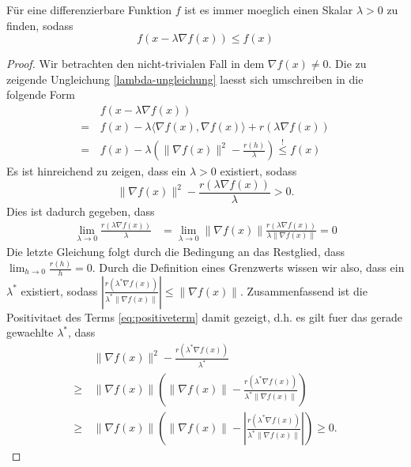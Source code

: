 \begin{Lem}
\label{lem:gradientabstieg}
F\"ur eine differenzierbare Funktion $f$ ist es immer moeglich einen Skalar $\lambda>0$ zu finden, sodass
\begin{equation}
\label{lambda-ungleichung}
f(x - \lambda \nabla f(x)) \leq f(x)
\end{equation} 
\end{Lem}


\begin{proof}
Wir betrachten den nicht-trivialen Fall in dem $\nabla f(x) \neq 0$. 
Die zu zeigende Ungleichung \eqref{lambda-ungleichung} laesst sich umschreiben in die folgende Form
\begin{align*}
&f(x - \lambda \nabla f(x))\\
 = \, &f(x) - \lambda \langle \nabla f(x), \nabla f(x)\rangle + r(\lambda \nabla f(x)) \\
= \, &f(x) - \lambda( \|\nabla f(x)\|^2 - \frac{r(h)}{\lambda}) \overset{!}{\leq} f(x)
\end{align*}
Es ist hinreichend zu zeigen, dass ein $\lambda>0$ existiert, sodass
\begin{equation}
\label{eq:positiveterm}
\|\nabla f(x)\|^2 - \frac{r(\lambda \nabla f(x))}{\lambda} >0.
\end{equation}
  Dies ist dadurch gegeben, dass 
\begin{align*}
\lim_{\lambda\to 0} \frac{r(\lambda \nabla f(x))}{\lambda} &= \lim_{\lambda \to 0}\|\nabla f(x)\| \frac{r(\lambda \nabla f(x))}{\lambda \|\nabla f(x)\|}= 0
\end{align*}
Die letzte Gleichung folgt durch die Bedingung an das Restglied, dass $\lim_{h\to 0}\frac{r(h)}{h} = 0$. Durch die Definition eines Grenzwerts wissen wir also, dass ein $\lambda^*$ existiert, sodass $\left| \frac{r(\lambda^* \nabla f(x))}{\lambda^* \|\nabla f(x)\|} \right| \leq \|\nabla f(x)\|$. Zusammenfassend ist die Positivitaet des Terms \eqref{eq:positiveterm} damit gezeigt, d.h. es gilt fuer das gerade gewaehlte $\lambda^*$, dass
\begin{align*}
&\|\nabla f(x)\|^2 - \frac{r(\lambda^* \nabla f(x))}{\lambda^*} \\
\geq \, &\|\nabla f(x)\| \left( \| \nabla f(x)\| - \frac{r (\lambda^* \nabla f(x))}{\lambda^* \| \nabla f(x)\|} \right) \\
\geq \, &\| \nabla f(x)\| \left(\|\nabla f(x)\| - \left| \frac{r (\lambda^* \nabla f(x))}{\lambda^* \| \nabla f(x)\|}\right| \right) \geq 0. 
\end{align*}
\end{proof}



